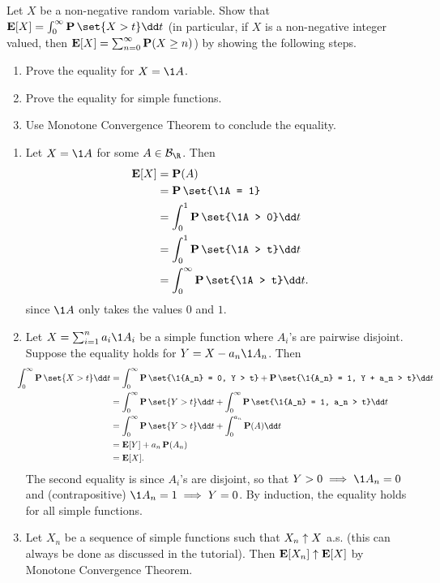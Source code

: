 \documentclass[12pt]{article}
\begin{document}
\begin{problem*}
    Let $X$ be a non-negative random variable.
    Show that $\E[X] = \int_0^\infty \P\set{X > t} \dd t$
    (in particular, if $X$ is a non-negative integer valued,
    then $\operatorname{\mathbf E}[X] = \sum_{n=0}^\infty \operatorname{\mathbf P}(X \ge n)$)
    by showing the following steps.
    \begin{enumerate}
        \item Prove the equality for $X = \1A$.
        \item Prove the equality for simple functions.
        \item Use Monotone Convergence Theorem to conclude the equality.
    \end{enumerate}
\end{problem*}
\begin{solution} \leavevmode
    \begin{enumerate}
        \item Let $X = \1A$ for some $A \in \B_\R$.
        Then \begin{align*}
            \E[X] &= \P(A) \\
                &= \P\set{\1A = 1} \\
                &= \int_0^1 \P\set{\1A > 0} \dd t \\
                &= \int_0^1 \P\set{\1A > t} \dd t \\
                &= \int_0^\infty \P\set{\1A > t} \dd t.
        \end{align*} since $\1A$ only takes the values $0$ and $1$.
        \item Let $X = \sum_{i=1}^n a_i \1{A_i}$ be a simple function
        where $A_i$'s are pairwise disjoint.
        Suppose the equality holds for $Y = X - a_n \1{A_n}$.
        Then \begin{align*}
            \hspace{-1em}\int_0^\infty \P\set{X > t} \dd t
                &= \int_0^\infty \P\set{\1{A_n} = 0, Y > t}
                    + \P\set{\1{A_n} = 1, Y + a_n > t} \dd t \\
                &= \int_0^\infty \P\set{Y > t} \dd t
                    + \int_0^\infty \P\set{\1{A_n} = 1, a_n > t} \dd t \\
                &= \int_0^\infty \P\set{Y > t} \dd t
                    + \int_0^{a_n} \P(A) \dd t \\
                &= \E[Y] + a_n \P(A_n) \\
                &= \E[X].
        \end{align*}
        The second equality is since $A_i$'s are disjoint,
        so that $Y > 0 \implies \1{A_n} = 0$
        and (contrapositive) $\1{A_n} = 1 \implies Y = 0$.
        By induction, the equality holds for all simple functions.
        \item Let $X_n$ be a sequence of simple functions such that
        $X_n \uparrow X$ a.s. (this can always be done as discussed in
        the tutorial).
        Then $\operatorname{\mathbf E}[X_n] \uparrow \operatorname{\mathbf E}[X]$ by Monotone Convergence Theorem.


\end{enumerate}
\end{solution}
\end{document}
